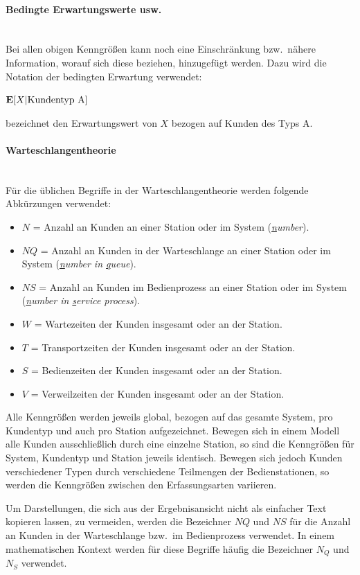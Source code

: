 \documentclass[deutsch]{svmono}
\begin{document}
\paragraph{Bedingte Erwartungswerte usw.}~\\
Bei allen obigen Kenngrößen kann noch eine Einschränkung bzw.\ nähere Information, worauf sich diese beziehen, hinzugefügt werden. Dazu wird die Notation der bedingten Erwartung verwendet:

${\bf E}[X|\textrm{Kundentyp A}]$

bezeichnet den Erwartungswert von $X$ bezogen auf Kunden des Typs A.

\paragraph{Warteschlangentheorie}~\\
Für die üblichen Begriffe in der Warteschlangentheorie werden folgende Abkürzungen verwendet:
\begin{itemize}
\item
$N$ = Anzahl an Kunden an einer Station oder im System (\textit{\underline{n}umber}).
\item
$NQ$ = Anzahl an Kunden in der Warteschlange an einer Station oder im System (\textit{\underline{n}umber in \underline{q}ueue}).
\item
$NS$ = Anzahl an Kunden im Bedienprozess an einer Station oder im System (\textit{\underline{n}umber in \underline{s}ervice process}).
\item
$W$ = Wartezeiten der Kunden insgesamt oder an der Station.
\item
$T$ = Transportzeiten der Kunden insgesamt oder an der Station.
\item
$S$ = Bedienzeiten der Kunden insgesamt oder an der Station.
\item
$V$ = Verweilzeiten der Kunden insgesamt oder an der Station.
\end{itemize}

Alle Kenngrößen werden jeweils global, bezogen auf das gesamte System, pro Kundentyp und auch pro Station aufgezeichnet. Bewegen sich in einem Modell alle Kunden ausschließlich durch eine einzelne Station, so sind die Kenngrößen für System, Kundentyp und Station jeweils identisch. Bewegen sich jedoch Kunden verschiedener Typen durch verschiedene Teilmengen der Bedienstationen, so werden die Kenngrößen zwischen den Erfassungsarten variieren.

Um Darstellungen, die sich aus der Ergebnisansicht nicht als einfacher Text kopieren lassen, zu vermeiden, werden die Bezeichner $NQ$ und $NS$ für die Anzahl an Kunden in der Warteschlange bzw.\ im Bedienprozess verwendet. In einem mathematischen Kontext werden für diese Begriffe häufig die Bezeichner $N_Q$ und $N_S$ verwendet.
\end{document}
